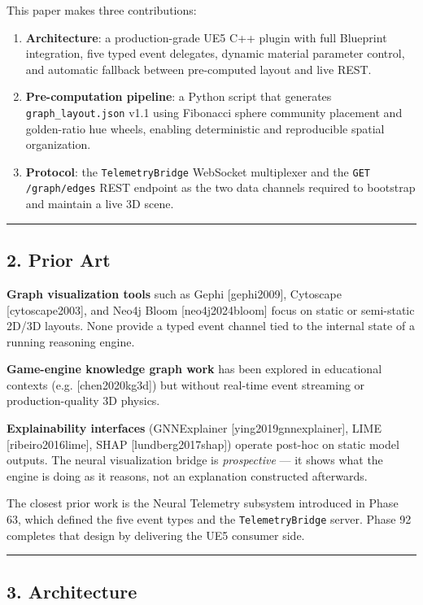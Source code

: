 This paper makes three contributions:

\begin{enumerate}
  \item \textbf{Architecture}: a production-grade UE5 C++ plugin with full Blueprint integration, five typed event delegates, dynamic material parameter control, and automatic fallback between pre-computed layout and live REST.
  \item \textbf{Pre-computation pipeline}: a Python script that generates \texttt{graph\_layout.json} v1.1 using Fibonacci sphere community placement and golden-ratio hue wheels, enabling deterministic and reproducible spatial organization.
  \item \textbf{Protocol}: the \texttt{TelemetryBridge} WebSocket multiplexer and the \texttt{GET /graph/edges} REST endpoint as the two data channels required to bootstrap and maintain a live 3D scene.
\end{enumerate}


\medskip\noindent\rule{\linewidth}{0.4pt}\medskip

\subsection*{2. Prior Art}

\textbf{Graph visualization tools} such as Gephi [gephi2009], Cytoscape [cytoscape2003], and Neo4j Bloom [neo4j2024bloom] focus on static or semi-static 2D/3D layouts. None provide a typed event channel tied to the internal state of a running reasoning engine.

\textbf{Game-engine knowledge graph work} has been explored in educational contexts (e.g. [chen2020kg3d]) but without real-time event streaming or production-quality 3D physics.

\textbf{Explainability interfaces} (GNNExplainer [ying2019gnnexplainer], LIME [ribeiro2016lime], SHAP [lundberg2017shap]) operate post-hoc on static model outputs. The neural visualization bridge is \textit{prospective} --- it shows what the engine is doing as it reasons, not an explanation constructed afterwards.

The closest prior work is the Neural Telemetry subsystem introduced in Phase 63, which defined the five event types and the \texttt{TelemetryBridge} server. Phase 92 completes that design by delivering the UE5 consumer side.

\medskip\noindent\rule{\linewidth}{0.4pt}\medskip

\subsection*{3. Architecture}

